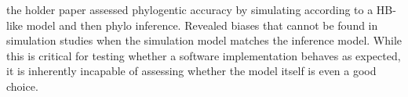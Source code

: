 \documentclass{pnastwo}
\begin{document}
the holder paper assessed phylogentic accuracy by simulating according to a HB-like model and then phylo inference. Revealed biases that cannot be found in simulation studies when the simulation model matches the inference model. While this is critical for testing whether a software implementation behaves as expected, it is inherently incapable of assessing whether the model itself is even a good choice.


\end{document}
